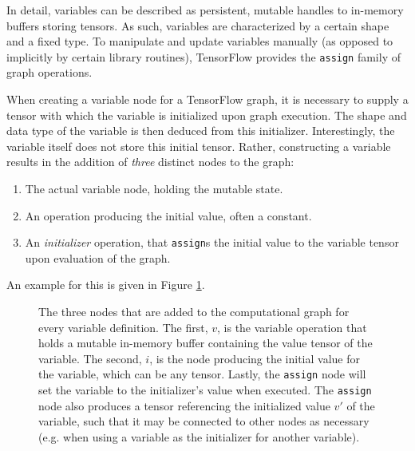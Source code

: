 In detail, variables can be described as persistent, mutable handles to
in-memory buffers storing tensors. As such, variables are characterized by a
certain shape and a fixed type. To manipulate and update variables manually (as
opposed to implicitly by certain library routines), TensorFlow provides the
\texttt{assign} family of graph operations.

When creating a variable node for a TensorFlow graph, it is necessary to supply
a tensor with which the variable is initialized upon graph execution. The shape
and data type of the variable is then deduced from this
initializer. Interestingly, the variable itself does not store this initial
tensor. Rather, constructing a variable results in the addition of \emph{three}
distinct nodes to the graph:

\begin{enumerate}
  \item The actual variable node, holding the mutable state.
  \item An operation producing the initial value, often a constant.
  \item An \emph{initializer} operation, that \texttt{assign}s the initial value
    to the variable tensor upon evaluation of the graph.
\end{enumerate}

An example for this is given in Figure \ref{fig:variable}.

\begin{figure}
  \centering
  \caption{The three nodes that are added to the computational graph for every
    variable definition. The first, $v$, is the variable operation that holds a
    mutable in-memory buffer containing the value tensor of the variable. The
    second, $i$, is the node producing the initial value for the variable, which
    can be any tensor. Lastly, the \texttt{assign} node will set the variable to
    the initializer's value when executed. The \texttt{assign} node also
    produces a tensor referencing the initialized value $v'$ of the variable,
    such that it may be connected to other nodes as necessary (e.g. when using a
    variable as the initializer for another variable).}
  \label{fig:variable}
\end{figure}

